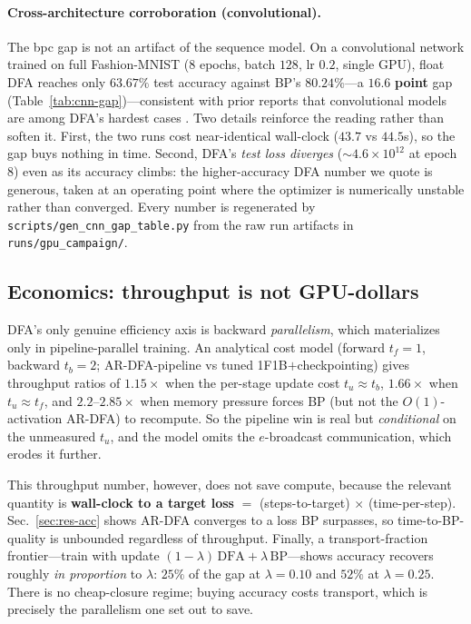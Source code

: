 \documentclass[11pt]{article}
\newcommand{\ARDFA}{\textsc{AR-DFA}}
\begin{document}
\paragraph{Cross-architecture corroboration (convolutional).} The bpc gap is not an artifact of the sequence model. On a convolutional network trained on full Fashion-MNIST ($8$ epochs, batch $128$, lr $0.2$, single GPU), float DFA reaches only $63.67\%$ test accuracy against BP's $80.24\%$---a $\mathbf{16.6}$ \textbf{point} gap (Table~\ref{tab:cnn-gap})---consistent with prior reports that convolutional models are among DFA's hardest cases \citep{launay2020direct}. Two details reinforce the reading rather than soften it. First, the two runs cost near-identical wall-clock ($43.7$ vs $44.5$s), so the gap buys nothing in time. Second, DFA's \emph{test loss diverges} ($\sim\!4.6\times10^{12}$ at epoch $8$) even as its accuracy climbs: the higher-accuracy DFA number we quote is generous, taken at an operating point where the optimizer is numerically unstable rather than converged. Every number is regenerated by \texttt{scripts/gen\_cnn\_gap\_table.py} from the raw run artifacts in \texttt{runs/gpu\_campaign/}.
\begin{table}[H]
\centering\footnotesize

\caption{Convolutional BP vs.\ float DFA on full Fashion-MNIST (single GPU, $8$ epochs). DFA trails BP by $16.6$ test-accuracy points at matched wall-clock; its training loss diverges at the quoted operating point.}
\label{tab:cnn-gap}
\end{table}

\subsection{Economics: throughput is not GPU-dollars}\label{sec:econ}
DFA's only genuine efficiency axis is backward \emph{parallelism}, which materializes only in pipeline-parallel training. An analytical cost model (forward $t_f{=}1$, backward $t_b{=}2$; \ARDFA-pipeline vs tuned 1F1B$+$checkpointing) gives throughput ratios of $1.15\times$ when the per-stage update cost $t_u\!\approx\!t_b$, $1.66\times$ when $t_u\!\approx\!t_f$, and $2.2$--$2.85\times$ when memory pressure forces BP (but not the $O(1)$-activation \ARDFA) to recompute. So the pipeline win is real but \emph{conditional} on the unmeasured $t_u$, and the model omits the $e$-broadcast communication, which erodes it further.

This throughput number, however, does not save compute, because the relevant quantity is \textbf{wall-clock to a target loss} $=$ (steps-to-target) $\times$ (time-per-step). Sec.~\ref{sec:res-acc} shows \ARDFA{} converges to a loss BP surpasses, so time-to-BP-quality is unbounded regardless of throughput. Finally, a transport-fraction frontier---train with update $(1{-}\lambda)\,\text{DFA} + \lambda\,\text{BP}$---shows accuracy recovers roughly \emph{in proportion} to $\lambda$: $25\%$ of the gap at $\lambda{=}0.10$ and $52\%$ at $\lambda{=}0.25$. There is no cheap-closure regime; buying accuracy costs transport, which is precisely the parallelism one set out to save.
\end{document}
